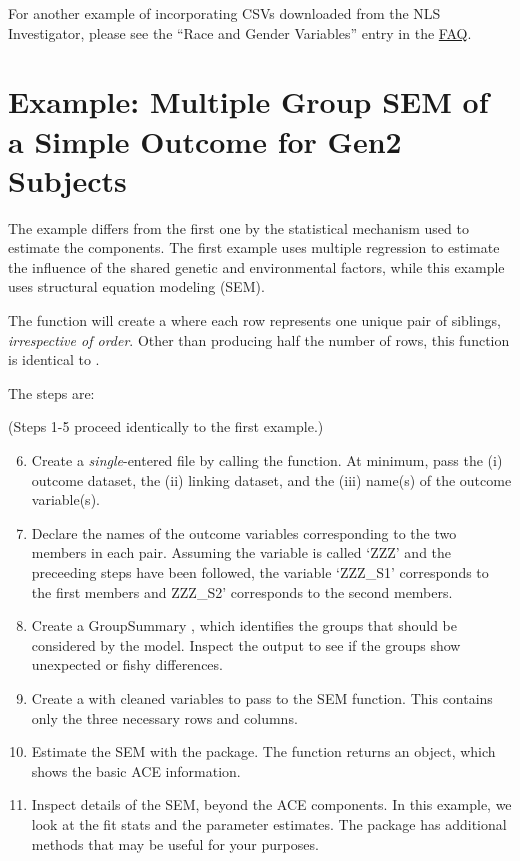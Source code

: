 \documentclass{article}\usepackage[]{graphicx}\usepackage[]{color}
\begin{document}
For another example of incorporating CSVs downloaded from the NLS Investigator, please see the ``Race and Gender Variables'' entry in the \href{http://cran.r-project.org/web/packages/NlsyLinks/vignettes/Faq.pdf}{FAQ}.

\section{Example: Multiple Group SEM of a Simple Outcome for Gen2 Subjects}
The example differs from the first one by the statistical mechanism used to estimate the components.  The first example uses multiple regression to estimate the influence of the shared genetic and environmental factors, while this example uses structural equation modeling (SEM).

The  function will create a  where each row represents one unique pair of siblings, \emph{irrespective of order}.  Other than producing half the number of rows, this function is identical to .

The steps are:

(Steps 1-5 proceed identically to the first example.)
\begin{enumerate}
\setcounter{enumi}{5}   
\item Create a \emph{single}-entered file by calling the  function.  At minimum, pass the (i) outcome dataset, the (ii) linking dataset, and the (iii) name(s) of the outcome variable(s). 
\item Declare the names of the outcome variables corresponding to the two members in each pair.  Assuming the variable is called `ZZZ' and the preceeding steps have been followed, the variable `ZZZ\_S1' corresponds to the first members and ZZZ\_S2' corresponds to the second members. 
\item Create a GroupSummary , which identifies the  groups that should be considered by the model.  Inspect the output to see if the groups show unexpected or fishy differences.
\item Create a  with cleaned variables to pass to the SEM function.  This  contains only the three necessary rows and columns.
\item Estimate the SEM with the  package.  The function returns an  object, which shows the basic ACE information.
\item Inspect details of the SEM, beyond the ACE components.  In this example, we look at the fit stats and the parameter estimates.  The  package has additional methods that may be useful for your purposes.
\end{enumerate}
\end{document}
